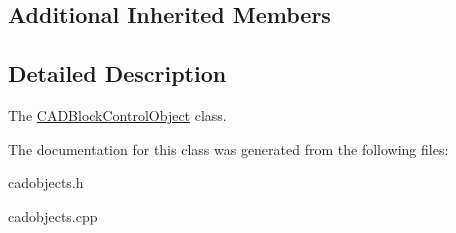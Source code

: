 \subsection*{Additional Inherited Members}


\subsection{Detailed Description}
The \hyperlink{class_c_a_d_block_control_object}{C\+A\+D\+Block\+Control\+Object} class. 

The documentation for this class was generated from the following files\+:\begin{DoxyCompactItemize}
\item 
cadobjects.\+h\item 
cadobjects.\+cpp\end{DoxyCompactItemize}
